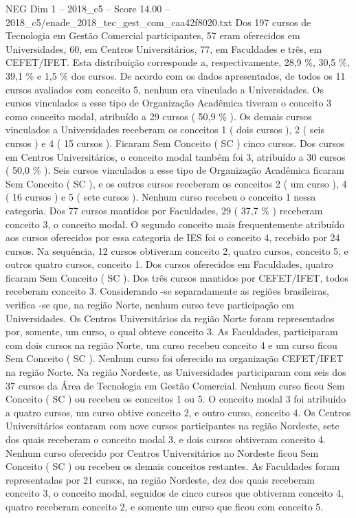 \begin{textsample}{NEG Dim 1 – 2018\_c5 – Score 14.00 – 2018\_c5/enade\_2018\_tec\_gest\_com\_caa42f8020.txt}
Dos 197 cursos de Tecnologia em Gestão Comercial participantes, 57 eram oferecidos em Universidades, 60, em Centros Universitários, 77, em Faculdades e três, em CEFET/IFET.
Esta distribuição corresponde a, respectivamente, 28,9 \%, 30,5 \%, 39,1 \% e 1,5 \% dos cursos.
De acordo com os dados apresentados, de todos os 11 cursos avaliados com conceito 5, nenhum era vinculado a Universidades.
Os cursos vinculados a esse tipo de Organização Acadêmica tiveram o conceito 3 como conceito modal, atribuído a 29 cursos ( 50,9 \% ).
Os demais cursos vinculados a Universidades receberam os conceitos 1 ( dois cursos ), 2 ( seis cursos ) e 4 ( 15 cursos ).
Ficaram Sem Conceito ( SC ) cinco cursos.
Dos cursos em Centros Universitários, o conceito modal também foi 3, atribuído a 30 cursos ( 50,0 \% ).
Seis cursos vinculados a esse tipo de Organização Acadêmica ficaram Sem Conceito ( SC ), e os outros cursos receberam os conceitos 2 ( um curso ), 4 ( 16 cursos ) e 5 ( sete cursos ).
Nenhum curso recebeu o conceito 1 nessa categoria.
Dos 77 cursos mantidos por Faculdades, 29 ( 37,7 \% ) receberam conceito 3, o conceito modal.
O segundo conceito mais frequentemente atribuído aos cursos oferecidos por essa categoria de IES foi o conceito 4, recebido por 24 cursos.
Na sequência, 12 cursos obtiveram conceito 2, quatro cursos, conceito 5, e outros quatro cursos, conceito 1.
Dos cursos oferecidos em Faculdades, quatro ficaram Sem Conceito ( SC ).
Dos três cursos mantidos por CEFET/IFET, todos receberam conceito 3.
Considerando -se separadamente as regiões brasileiras, verifica -se que, na região Norte, nenhum curso teve participação em Universidades.
Os Centros Universitários da região Norte foram representados por, somente, um curso, o qual obteve conceito 3.
As Faculdades, participaram com dois cursos na região Norte, um curso recebeu conceito 4 e um curso ficou Sem Conceito ( SC ).
Nenhum curso foi oferecido na organização CEFET/IFET na região Norte.
Na região Nordeste, as Universidades participaram com seis dos 37 cursos da Área de Tecnologia em Gestão Comercial.
Nenhum curso ficou Sem Conceito ( SC ) ou recebeu os conceitos 1 ou 5.
O conceito modal 3 foi atribuído a quatro cursos, um curso obtive conceito 2, e outro curso, conceito 4.
Os Centros Universitários contaram com nove cursos participantes na região Nordeste, sete dos quais receberam o conceito modal 3, e dois cursos obtiveram conceito 4.
Nenhum curso oferecido por Centros Universitários no Nordeste ficou Sem Conceito ( SC ) ou recebeu os demais conceitos restantes.
As Faculdades foram representadas por 21 cursos, na região Nordeste, dez dos quais receberam conceito 3, o conceito modal, seguidos de cinco cursos que obtiveram conceito 4, quatro receberam conceito 2, e somente um curso que ficou com conceito 5.

\end{textsample}
